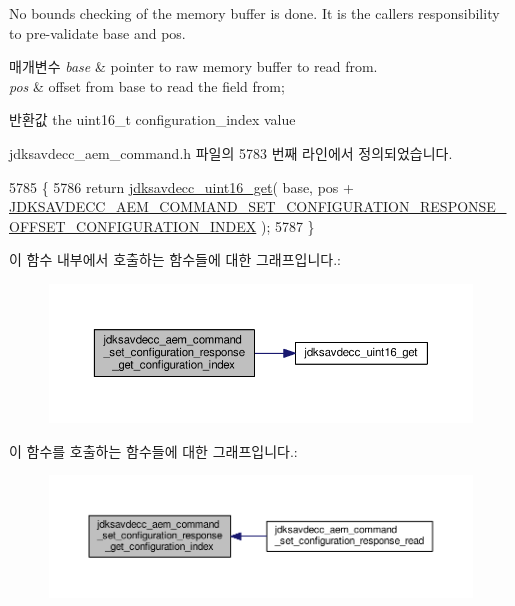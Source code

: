 No bounds checking of the memory buffer is done. It is the caller\textquotesingle{}s responsibility to pre-\/validate base and pos.


\begin{DoxyParams}{매개변수}
{\em base} & pointer to raw memory buffer to read from. \\
\hline
{\em pos} & offset from base to read the field from; \\
\hline
\end{DoxyParams}
\begin{DoxyReturn}{반환값}
the uint16\+\_\+t configuration\+\_\+index value 
\end{DoxyReturn}


jdksavdecc\+\_\+aem\+\_\+command.\+h 파일의 5783 번째 라인에서 정의되었습니다.


\begin{DoxyCode}
5785 \{
5786     \textcolor{keywordflow}{return} \hyperlink{group__endian_ga3fbbbc20be954aa61e039872965b0dc9}{jdksavdecc\_uint16\_get}( base, pos + 
      \hyperlink{group__command__set__configuration__response_gaae68ce83949da305879810d71ae55dca}{JDKSAVDECC\_AEM\_COMMAND\_SET\_CONFIGURATION\_RESPONSE\_OFFSET\_CONFIGURATION\_INDEX}
       );
5787 \}
\end{DoxyCode}


이 함수 내부에서 호출하는 함수들에 대한 그래프입니다.\+:
\nopagebreak
\begin{figure}[H]
\begin{center}
\leavevmode
\includegraphics[width=350pt]{group__command__set__configuration__response_ga7fcd774c91658de631938658d07d7003_cgraph}
\end{center}
\end{figure}




이 함수를 호출하는 함수들에 대한 그래프입니다.\+:
\nopagebreak
\begin{figure}[H]
\begin{center}
\leavevmode
\includegraphics[width=350pt]{group__command__set__configuration__response_ga7fcd774c91658de631938658d07d7003_icgraph}
\end{center}
\end{figure}


